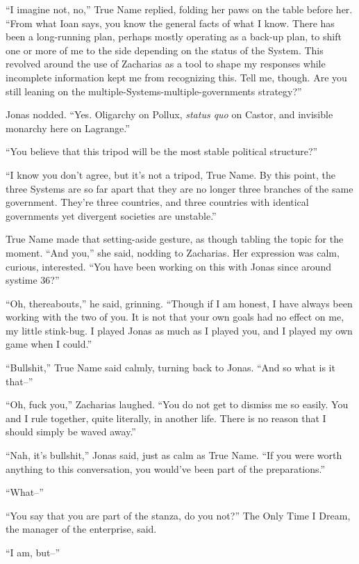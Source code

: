 ``I imagine not, no,'' True Name replied, folding her paws on the table before her. ``From what Ioan says, you know the general facts of what I know. There has been a long-running plan, perhaps mostly operating as a back-up plan, to shift one or more of me to the side depending on the status of the System. This revolved around the use of Zacharias as a tool to shape my responses while incomplete information kept me from recognizing this. Tell me, though. Are you still leaning on the multiple-Systems-multiple-governments strategy?''

Jonas nodded. ``Yes. Oligarchy on Pollux, \emph{status quo} on Castor, and invisible monarchy here on Lagrange.''

``You believe that this tripod will be the most stable political structure?''

``I know you don't agree, but it's not a tripod, True Name. By this point, the three Systems are so far apart that they are no longer three branches of the same government. They're three countries, and three countries with identical governments yet divergent societies are unstable.''

True Name made that setting-aside gesture, as though tabling the topic for the moment. ``And you,'' she said, nodding to Zacharias. Her expression was calm, curious, interested. ``You have been working on this with Jonas since around systime 36?''

``Oh, thereabouts,'' he said, grinning. ``Though if I am honest, I have always been working with the two of you. It is not that your own goals had no effect on me, my little stink-bug. I played Jonas as much as I played you, and I played my own game when I could.''

``Bullshit,'' True Name said calmly, turning back to Jonas. ``And so what is it that--''

``Oh, fuck you,'' Zacharias laughed. ``You do not get to dismiss me so easily. You and I rule together, quite literally, in another life. There is no reason that I should simply be waved away.''

``Nah, it's bullshit,'' Jonas said, just as calm as True Name. ``If you were worth anything to this conversation, you would've been part of the preparations.''

``What--''

``You say that you are part of the stanza, do you not?'' The Only Time I Dream, the manager of the enterprise, said.

``I am, but--''

